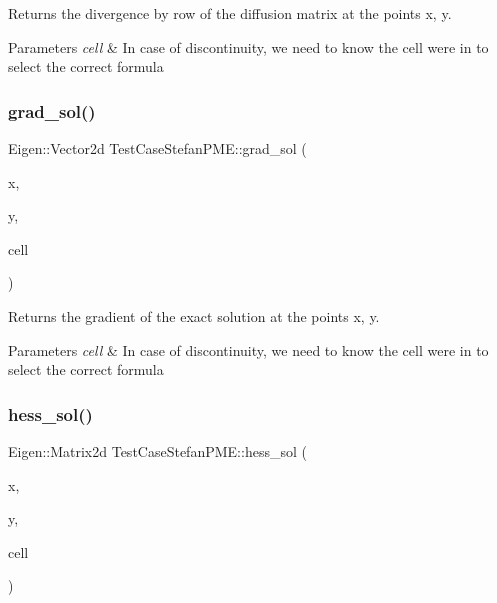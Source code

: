 Returns the divergence by row of the diffusion matrix at the points x, y. 


\begin{DoxyParams}{Parameters}
{\em cell} & In case of discontinuity, we need to know the cell we\textquotesingle{}re in to select the correct formula \\
\hline
\end{DoxyParams}
\mbox{\label{classTestCaseStefanPME_a9beffb89d9ccf0e0092df1eac1beac6e}} 
\subsubsection{\texorpdfstring{grad\+\_\+sol()}{grad\_sol()}}
{\footnotesize\ttfamily Eigen\+::\+Vector2d Test\+Case\+Stefan\+P\+M\+E\+::grad\+\_\+sol (\begin{DoxyParamCaption}\item[{const double}]{x,  }\item[{const double}]{y,  }\item[{const \hyperlink{classHArDCore2D_1_1Cell}{Cell} $\ast$}]{cell }\end{DoxyParamCaption})}



Returns the gradient of the exact solution at the points x, y. 


\begin{DoxyParams}{Parameters}
{\em cell} & In case of discontinuity, we need to know the cell we\textquotesingle{}re in to select the correct formula \\
\hline
\end{DoxyParams}
\mbox{\label{classTestCaseStefanPME_a54e4ead2ac700269fd940dcdd739f517}} 
\subsubsection{\texorpdfstring{hess\+\_\+sol()}{hess\_sol()}}
{\footnotesize\ttfamily Eigen\+::\+Matrix2d Test\+Case\+Stefan\+P\+M\+E\+::hess\+\_\+sol (\begin{DoxyParamCaption}\item[{const double}]{x,  }\item[{const double}]{y,  }\item[{const \hyperlink{classHArDCore2D_1_1Cell}{Cell} $\ast$}]{cell }\end{DoxyParamCaption})}



